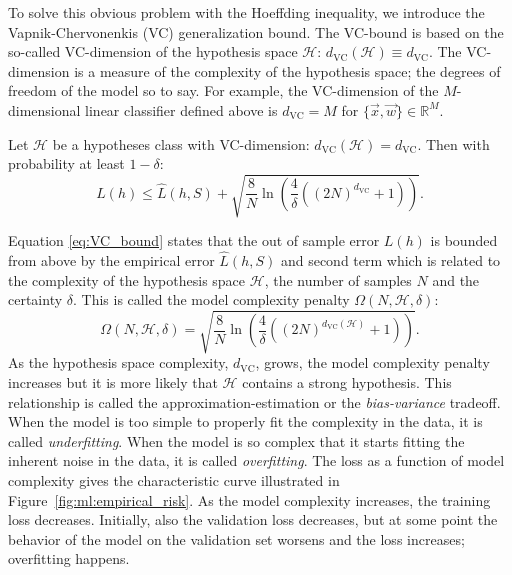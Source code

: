 To solve this obvious problem with the Hoeffding inequality, we introduce the Vapnik-Chervonenkis (VC) generalization bound. The VC-bound is based on the so-called VC-dimension of the hypothesis space $\mathcal{H}$: $d_\mathrm{VC}(\mathcal{H}) \equiv d_\mathrm{VC}$. The VC-dimension is a measure of the complexity of the hypothesis space; the degrees of freedom of the model so to say. For example, the VC-dimension of the $M$-dimensional linear classifier defined above is $d_\mathrm{VC}=M$ for $\{\vec{x}, \vec{w}\} \in \mathbb{R}^M$. 
\begin{theorem}
  \label{theorem:VC_generalization_bound}
  Let $\mathcal{H}$ be a hypotheses class with VC-dimension: $d_\mathrm{VC}(\mathcal{H}) = d_\mathrm{VC}$. Then with probability at least $1-\delta$: 
  \begin{equation}
    \label{eq:VC_bound}
    L(h) \leq \hat{L}(h, S) + \sqrt{ \frac{8}{N} \ln \left( \frac{4}{\delta} \left( \left(2N \right)^{d_\mathrm{VC}} + 1 \right)  \right)} .
  \end{equation}
\end{theorem}
Equation \eqref{eq:VC_bound} states that the out of sample error $L(h)$ is bounded from above by the empirical error $\hat{L}(h, S)$ and second term which is related to the complexity of the hypothesis space $\mathcal{H}$, the number of samples $N$ and the certainty $\delta$. This is called the model complexity penalty $\Omega(N, \mathcal{H}, \delta)$:
\begin{equation}
  \Omega(N, \mathcal{H}, \delta) = \sqrt{ \frac{8}{N} \ln \left( \frac{4}{\delta} \left( \left(2N \right)^{d_\mathrm{VC}(\mathcal{H})} + 1 \right)  \right)}.
\end{equation}
As the hypothesis space complexity, $d_\mathrm{VC}$, grows, the model complexity penalty increases but it is more likely that $\mathcal{H}$ contains a strong hypothesis. This relationship is called the approximation-estimation or the  \emph{bias-variance} tradeoff. When the model is too simple to properly fit the complexity in the data, it is called \emph{underfitting}. When the model is so complex that it starts fitting the inherent noise in the data, it is called \emph{overfitting}. The loss as a function of model complexity gives the characteristic curve illustrated in Figure~\ref{fig:ml:empirical_risk}. As the model complexity increases, the training loss decreases. Initially, also the validation loss decreases, but at some point the behavior of the model on the validation set worsens and the loss increases; overfitting happens. 


